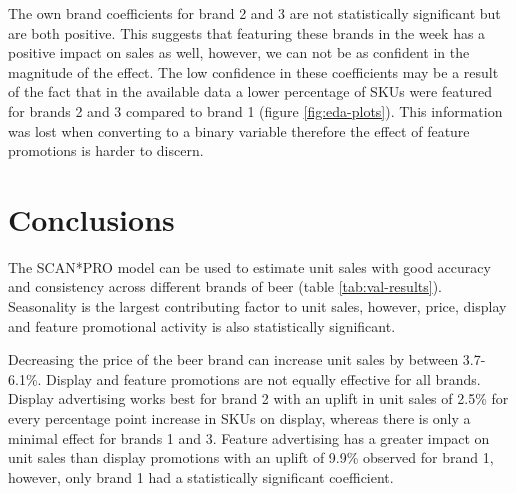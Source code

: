 \documentclass[a4paper,11pt]{article}
\begin{document}
The own brand coefficients for brand 2 and 3 are not statistically significant but are both positive. This suggests that featuring these brands in the week has a positive impact on sales as well, however, we can not be as confident in the magnitude of the effect. The low confidence in these coefficients may be a result of the fact that in the available data a lower percentage of SKUs were featured for brands 2 and 3 compared to brand 1 (figure \ref{fig:eda-plots}). This information was lost when converting to a binary variable therefore the effect of feature promotions is harder to discern.


\section{Conclusions}

The SCAN*PRO model can be used to estimate unit sales with good accuracy and consistency across different brands of beer (table \ref{tab:val-results}). Seasonality is the largest contributing factor to unit sales, however, price, display and feature promotional activity is also statistically significant. 

Decreasing the price of the beer brand can increase unit sales by between 3.7-6.1\%. Display and feature promotions are not equally effective for all brands. Display advertising works best for brand 2 with an uplift in unit sales of 2.5\% for every percentage point increase in SKUs on display, whereas there is only a minimal effect for brands 1 and 3. Feature advertising has a greater impact on unit sales than display promotions with an uplift of 9.9\% observed for brand 1, however, only brand 1 had a statistically significant coefficient.
\end{document}
